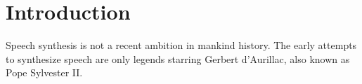 \section{Introduction}
\label{intro}
\thispagestyle{empty}

Speech synthesis is not a recent ambition in mankind history. The early attempts to synthesize speech are only legends starring Gerbert d'Aurillac, also known as Pope Sylvester II. 